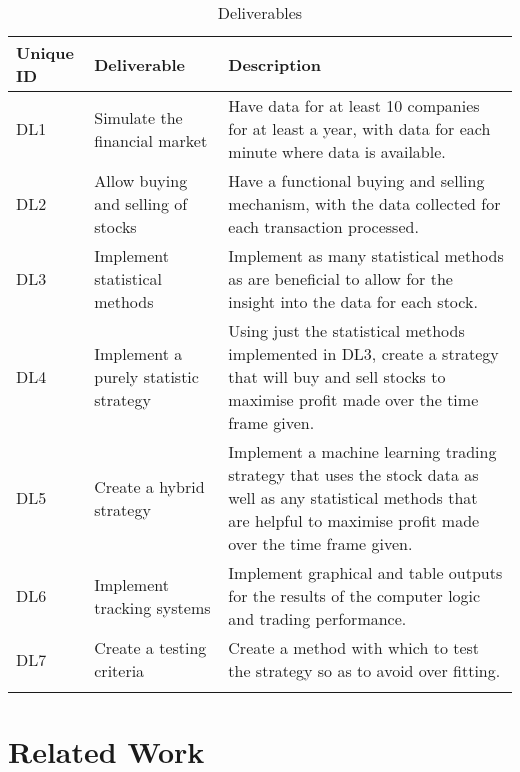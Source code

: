 \documentclass[12pt,a4paper]{article}
\begin{document}
\label{units}
\begin{longtable}{ |p{1.5cm}|p{5.5cm}|p{8cm}| }\hline\hline
Unique ID & Deliverable & Description \\ \hline
DL1 & Simulate the financial market & Have data for at least 10 companies for at least a year, with data for each minute where data is available. \\ \hline
DL2 & Allow buying and selling of stocks & Have a functional buying and selling mechanism, with the data collected for each transaction processed. \\ \hline
DL3 & Implement statistical methods & Implement as many statistical methods as are beneficial to allow for the insight into the data for each stock. \\ \hline
DL4 & Implement a purely statistic strategy & Using just the statistical methods implemented in DL3, create a strategy that will buy and sell stocks to maximise profit made over the time frame given. \\ \hline
DL5 & Create a hybrid strategy & Implement a machine learning trading strategy that uses the stock data as well as any statistical methods that are helpful to maximise profit made over the time frame given. \\ \hline
DL6 & Implement tracking systems & Implement graphical and table outputs for the results of the computer logic and trading performance. \\ \hline
DL7 & Create a testing criteria & Create a method with which to test the strategy so as to avoid over fitting. \\ \hline
\caption{Deliverables}
\end{longtable}

\iffalse
#################################################################################
\fi

\section{Related Work}

\iffalse
This section presents a survey of existing work on the problems that this project addresses.  it should be between 2 to 4 pages in length.  The rest of this section shows the formats of subsections as well as some general formatting information for tables, figures, references and equations.
\fi



\iffalse
#################################################################################
\fi
\end{document}
